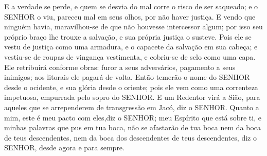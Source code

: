 {  E a verdade se perde, e quem se desvia do mal corre o risco de ser saqueado; e o SENHOR o viu, pareceu mal em seus olhos, por não haver justiça.
  E vendo que ninguém havia, maravilhou-se de que não houvesse intercessor algum; por isso seu próprio braço lhe trouxe a salvação, e sua própria justiça o susteve.
  Pois ele se vestu de justiça como uma armadura, e
{} o capacete da salvação em sua cabeça; e vestiu-se de roupas de vingança
{} vestimenta, e cobriu-se de selo como uma capa.
  Ele
{} retribuirá conforme
{} obras: furor a seus adversários, pagamento a seus inimigos; aos litorais ele pagará de volta.
  Então temerão o nome do SENHOR desde o ocidente, e sua glória desde o oriente; pois ele vem como uma correnteza impetuosa, empurrada pelo sopro
 do SENHOR.
  E um Redentor virá a Sião, para aqueles que se arrependerem de
{} transgressão em Jacó, diz o SENHOR.
  Quanto a mim, este é meu pacto com eles,diz o SENHOR; meu Espírito que está sobre ti, e minhas palavras que pus em tua boca, não se afastarão de tua boca nem da boca de teus descendentes,
 nem da boca dos descendentes de teus descendentes, diz o SENHOR, desde agora e para sempre.
\par }

